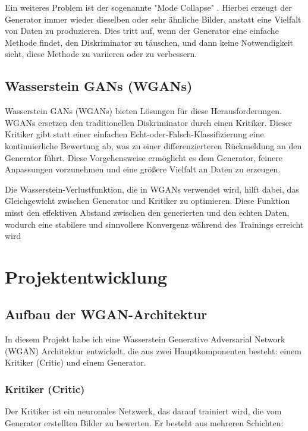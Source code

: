 \documentclass[a4paper, 12pt]{article}
\begin{document}
Ein weiteres Problem ist der sogenannte "Mode Collapse" \cite{mathworks_gan_training}. Hierbei erzeugt der Generator immer wieder dieselben oder sehr ähnliche Bilder, anstatt eine Vielfalt von Daten zu produzieren. Dies tritt auf, wenn der Generator eine einfache Methode findet, den Diskriminator zu täuschen, und dann keine Notwendigkeit sieht, diese Methode zu variieren oder zu verbessern.


\subsection{Wasserstein GANs (WGANs)}
Wasserstein GANs (WGANs) bieten Lösungen für diese Herausforderungen\cite{ar5iv_dynamic_discriminator}\cite{ar5iv_contrastive_discriminator}. WGANs ersetzen den traditionellen Diskriminator durch einen Kritiker. Dieser Kritiker gibt statt einer einfachen Echt-oder-Falsch-Klassifizierung eine kontinuierliche Bewertung ab, was zu einer differenzierteren Rückmeldung an den Generator führt. Diese Vorgehensweise ermöglicht es dem Generator, feinere Anpassungen vorzunehmen und eine größere Vielfalt an Daten zu erzeugen.

Die Wasserstein-Verlustfunktion, die in WGANs verwendet wird, hilft dabei, das Gleichgewicht zwischen Generator und Kritiker zu optimieren. Diese Funktion misst den effektiven Abstand zwischen den generierten und den echten Daten, wodurch eine stabilere und sinnvollere Konvergenz während des Trainings erreicht wird



\section{Projektentwicklung}
\subsection{Aufbau der WGAN-Architektur}

In diesem Projekt habe ich eine Wasserstein Generative Adversarial Network (WGAN) Architektur entwickelt, die aus zwei Hauptkomponenten besteht: einem Kritiker (Critic) und einem Generator.

\subsubsection{Kritiker (Critic)}

Der Kritiker ist ein neuronales Netzwerk, das darauf trainiert wird, die vom Generator erstellten Bilder zu bewerten. Er besteht aus mehreren Schichten:
\end{document}
